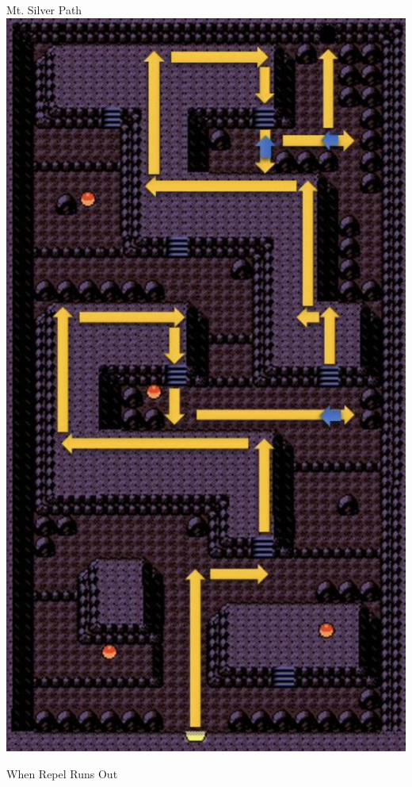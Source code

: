 \begin{paracol}{2}
\switchcolumn
\begin{story}{Mt. Silver Path}
	\varwb
	\includegraphics[scale=0.45]{../Graphics/31. Mt. Silver.png}
	\varwe
\end{story}

\switchcolumn
\begin{menu}{When Repel Runs Out}
	\varwb
	\begin{packMenu}
		\item \maxRepel
		\item \fullRestore
	\end{packMenu}
	\varwe
\end{menu}


\end{paracol}
